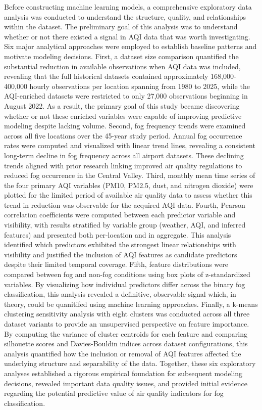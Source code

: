 \documentclass[
  letterpaper,
  DIV=11,
  numbers=noendperiod]{scrartcl}
\begin{document}
Before constructing machine learning models, a comprehensive exploratory
data analysis was conducted to understand the structure, quality, and
relationships within the dataset. The preliminary goal of this analysis
was to understand whether or not there existed a signal in AQI data that
was worth investigating. Six major analytical approaches were employed
to establish baseline patterns and motivate modeling decisions. First, a
dataset size comparison quantified the substantial reduction in
available observations when AQI data was included, revealing that the
full historical datasets contained approximately 168,000-400,000 hourly
observations per location spanning from 1980 to 2025, while the
AQI-enriched datasets were restricted to only 27,000 observations
beginning in August 2022. As a result, the primary goal of this study
became discovering whether or not these enriched variables were capable
of improving predictive modeling despite lacking volume. Second, fog
frequency trends were examined across all five locations over the
45-year study period. Annual fog occurrence rates were computed and
visualized with linear trend lines, revealing a consistent long-term
decline in fog frequency across all airport datasets. These declining
trends aligned with prior research linking improved air quality
regulations to reduced fog occurrence in the Central Valley. Third,
monthly mean time series of the four primary AQI variables (PM10, PM2.5,
dust, and nitrogen dioxide) were plotted for the limited period of
available air quality data to assess whether this trend in reduction was
observable for the acquired AQI data. Fourth, Pearson correlation
coefficients were computed between each predictor variable and
visibility, with results stratified by variable group (weather, AQI, and
inferred features) and presented both per-location and in aggregate.
This analysis identified which predictors exhibited the strongest linear
relationships with visibility and justified the inclusion of AQI
features as candidate predictors despite their limited temporal
coverage. Fifth, feature distributions were compared between fog and
non-fog conditions using box plots of z-standardized variables. By
visualizing how individual predictors differ across the binary fog
classification, this analysis revealed a definitive, observable signal
which, in theory, could be quanitifed using machine learning approaches.
Finally, a k-means clustering sensitivity analysis with eight clusters
was conducted across all three dataset variants to provide an
unsupervised perspective on feature importance. By computing the
variance of cluster centroids for each feature and comparing silhouette
scores and Davies-Bouldin indices across dataset configurations, this
analysis quantified how the inclusion or removal of AQI features
affected the underlying structure and separability of the data.
Together, these six exploratory analyses established a rigorous
empirical foundation for subsequent modeling decisions, revealed
important data quality issues, and provided initial evidence regarding
the potential predictive value of air quality indicators for fog
classification.
\end{document}
